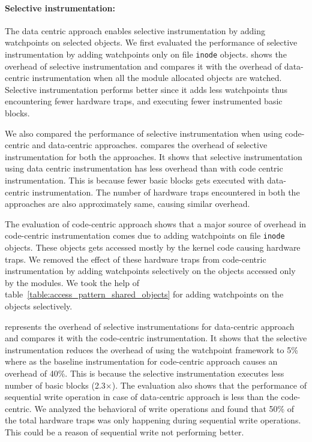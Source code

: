 \paragraph{Selective instrumentation:}
The data centric approach enables selective instrumentation by adding watchpoints on selected objects. We first evaluated the performance of selective instrumentation by adding watchpoints only on file \texttt{inode} objects.  shows the overhead of selective instrumentation and compares it with the overhead of data-centric instrumentation when all the module allocated objects are watched. Selective instrumentation performs better since it adds less watchpoints thus encountering fewer hardware traps, and executing fewer instrumented basic blocks.

We also compared the performance of selective instrumentation when using code-centric and data-centric approaches.  compares the overhead of selective instrumentation for both the approaches. It shows that selective instrumentation using data centric instrumentation has less overhead than with code centric instrumentation. This is because fewer basic blocks gets executed with data-centric instrumentation. The number of hardware traps encountered in both the approaches are also approximately same, causing similar overhead. 


The evaluation of code-centric approach shows that a major source of overhead in code-centric instrumentation comes due to adding watchpoints on file \texttt{inode} objects. These objects gets accessed mostly by the kernel code causing hardware traps. We removed the effect of these hardware traps from code-centric instrumentation by adding watchpoints selectively on the objects accessed only by the modules. We took the help of table~\ref{table:access_pattern_shared_objects} for adding watchpoints on the objects selectively.

  represents the overhead of selective instrumentations for data-centric approach and compares it with the code-centric instrumentation. It shows that the selective instrumentation reduces the overhead of using the watchpoint framework to {\texttildelow}5\% where as the baseline instrumentation for code-centric approach causes an overhead of {\texttildelow}40\%. This is because the selective instrumentation executes less number of basic blocks ({\texttildelow}2.3{\footnotesize$\times$}). The evaluation also shows that the performance of sequential write operation in case of data-centric approach is less than the code-centric. We analyzed the behavioral of write operations and found that {\texttildelow}50\% of the total hardware traps was only happening during sequential write operations. This could be a reason of sequential write not performing better.    

